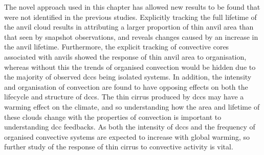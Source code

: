  
The novel approach used in this chapter has allowed new results to be found that were not identified in the previous studies.
Explicitly tracking the full lifetime of the anvil cloud results in attributing a larger proportion of thin anvil area than that seen by snapshot observations, and reveals changes caused by an increase in the anvil lifetime.
Furthermore, the explicit tracking of convective cores associated with anvils showed the response of thin anvil area to organisation, whereas without this the trends of organised convection would be hidden due to the majority of observed \acrshort{dcc}s being isolated systems.
In addition, the intensity and organisation of convection are found to have opposing effects on both the lifecycle and structure of \acrshort{dcc}s. 
The thin cirrus produced by \acrshort{dcc}s may have a warming effect on the climate, and so understanding how the area and lifetime of these clouds change with the properties of convection is important to understanding \acrshort{dcc} feedbacks. 
As both the intensity of \acrshort{dcc}s and the frequency of organised convective systems are expected to increase with global warming, so further study of the response of thin cirrus to convective activity is vital.


